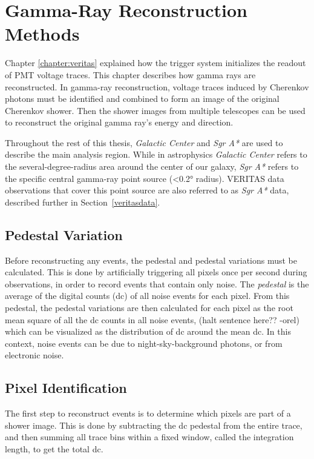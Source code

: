 \cleartooddpage[\thispagestyle{empty}]
\newcommand{\ETrue}{$\textrm{E}_{\textrm{True}}$}

\chapter{Gamma-Ray Reconstruction Methods}\label{ch:grrecon}

Chapter \ref{chapter:veritas} explained how the trigger system initializes the readout of PMT voltage traces.
This chapter describes how gamma rays are reconstructed.
In gamma-ray reconstruction, voltage traces induced by Cherenkov photons must be identified and combined to form an image of the original Cherenkov shower.
Then the shower images from multiple telescopes can be used to reconstruct the original gamma ray's energy and direction.

Throughout the rest of this thesis, \textit{Galactic Center} and \textit{Sgr A*} are used to describe the main analysis region.
While in astrophysics \textit{Galactic Center} refers to the several-degree-radius area around the center of our galaxy, \textit{Sgr A*} refers to the specific central gamma-ray point source (<\ang{0.2} radius).
VERITAS data observations that cover this point source are also referred to as \textit{Sgr A*} data, described further in Section~\ref{veritasdata}.


\section{Pedestal Variation}
Before reconstructing any events, the pedestal and pedestal variations must be calculated.
This is done by artificially triggering all pixels once per second during observations, in order to record events that contain only noise.
The \textit{pedestal} is the average of the digital counts (dc) of all noise events for each pixel.
From this pedestal, the pedestal variations are then calculated for each pixel as the root mean square of all the dc counts in all noise events, {\color{red}(halt sentence here?? -orel)} which can be visualized as the distribution of dc around the mean dc.
In this context, noise events can be due to night-sky-background photons, or from electronic noise.

\section{Pixel Identification}
The first step to reconstruct events is to determine which pixels are part of a shower image.
This is done by subtracting the dc pedestal from the entire trace, and then summing all trace bins within a fixed window, called the integration length, to get the total dc.

